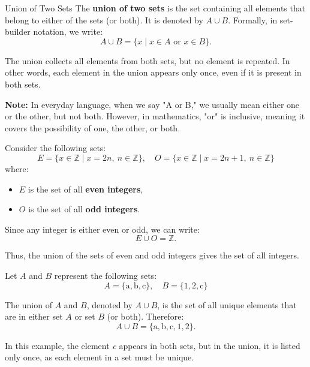 \begin{definitionbox}{Union of Two Sets}  
    The \textbf{union of two sets} is the set containing all elements that belong to either of the sets (or both). It is denoted by \( A \cup B \). Formally, in set-builder notation, we write:  
    \[
    A \cup B = \{ x \mid x \in A \text{ or } x \in B \}.
    \]  
    
    The union collects all elements from both sets, but no element is repeated. In other words, each element in the union appears only once, even if it is present in both sets.  
    
    \textbf{Note:} In everyday language, when we say "A or B," we usually mean either one or the other, but not both. However, in mathematics, "or" is inclusive, meaning it covers the possibility of one, the other, or both.  
\end{definitionbox}    

\begin{example}  
    Consider the following sets:  
    \[
    E = \{x \in \mathbb{Z} \mid x = 2n, \ n \in \mathbb{Z} \}, \quad O = \{x \in \mathbb{Z} \mid x = 2n + 1, \ n \in \mathbb{Z} \}
    \]  
    where:  
    \begin{itemize}  
        \item \( E \) is the set of all \textbf{even integers},  
        \item \( O \) is the set of all \textbf{odd integers}.  
    \end{itemize}  
    
    Since any integer is either even or odd, we can write:  
    \[
    E \cup O = \mathbb{Z}.
    \]  
    
    Thus, the union of the sets of even and odd integers gives the set of all integers.  
\end{example}

\begin{example}  
    Let \( A \) and \( B \) represent the following sets:  
    \[
    A = \{\text{a}, \text{b}, \text{c}\}, \quad B = \{\text{1}, \text{2}, \text{c}\}
    \]  
    
    The union of \( A \) and \( B \), denoted by \( A \cup B \), is the set of all unique elements that are in either set \( A \) or set \( B \) (or both). Therefore:  
    \[
    A \cup B = \{\text{a}, \text{b}, \text{c}, \text{1}, \text{2}\}.
    \]  
    
    In this example, the element \textit{c} appears in both sets, but in the union, it is listed only once, as each element in a set must be unique.  
\end{example}


